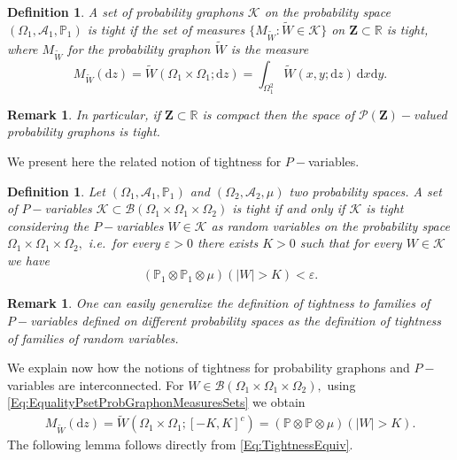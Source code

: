 \documentclass[11pt]{article}
\newtheorem{definition}[theorem]{Definition}
\newtheorem{remark}[theorem]{Remark}
\def\R{\mathbb{R}}
\def\P{\mathbb{P}}
\newcommand{\cA}{{\mathcal A}}  %
\newcommand{\cB}{{\mathcal B}}  %
\newcommand{\cK}{{\mathcal K}}  %
\newcommand{\cP}{{\mathcal P}}  %
\newcommand{\Space}{\mathbf{Z}}
\renewcommand{\P}{\mathbb{P}}
\newcommand{\drv}{\mathrm{d}}
\begin{document}
\begin{definition}
A set of probability graphons $\cK$ on the probability space $(\Omega_1,\cA_1,\P_1)$ is \emph{tight} if the set of measures $\{ M_{\widetilde W} : \widetilde W\in\mathcal{K} \} $ on $\Space\subset \R$ is tight, where $M_{\widetilde W}$ for the probability graphon $\widetilde W$ is the measure
\begin{equation}
  \label{eq:def-MW}
M_{\widetilde W}(\drv z) 
=  \widetilde W  (\Omega_1\times \Omega_1; \drv z)
= \int_{\Omega_1^2} \widetilde  W(x,y;\drv z) \ \drv x \drv y.
\end{equation}
\end{definition}

\begin{remark}
In particular, if $\Space\subset \R$ is compact then the space of $\cP(\Space)-$valued probability graphons is tight. 
\end{remark}

We present here the related notion of tightness for $P-$variables.

\begin{definition}
Let $(\Omega_1,\cA_1,\P_1)$ and $(\Omega_2,\cA_2,\mu)$ two probability spaces.  A set of $P-$variables $\cK\subset \cB(\Omega_1\times\Omega_1\times \Omega_2)$ is \emph{tight} if and only if $\mathcal{K}$ is tight considering the $P-$variables $W\in \mathcal{K}$ as random variables on the probability space $\Omega_1\times \Omega_1\times \Omega_2,$ i.e.\ for every $\varepsilon>0$ there exists $K>0$ such that for every $W\in \mathcal{K}$ we have
\begin{equation}\label{tightCondit}
    (\mathbb{P}_1\otimes \mathbb{P}_1\otimes \mu)\left(|W|>K\right)<\varepsilon.
\end{equation}
\end{definition}

\begin{remark}
One can easily generalize the definition of tightness to families of $P-$variables defined on different probability spaces as the definition of tightness of families of random variables. 
\end{remark}
We explain now how the notions of tightness for probability graphons and $P-$variables are interconnected.
For $W\in \cB(\Omega_1\times\Omega_1\times \Omega_2),$ using \eqref{Eq:EqualityPsetProbGraphonMeasuresSets} we obtain 
\begin{equation}\label{Eq:TightnessEquiv}
\begin{aligned}
  M_{\widetilde W}(\drv z) 
=\widetilde  W  (\Omega_1\times \Omega_1; [-K,K]^c)=(\P\otimes \P\otimes \mu)\left(|W|>K\right).
\end{aligned}
\end{equation}
The following lemma follows directly from \eqref{Eq:TightnessEquiv}.
\end{document}
